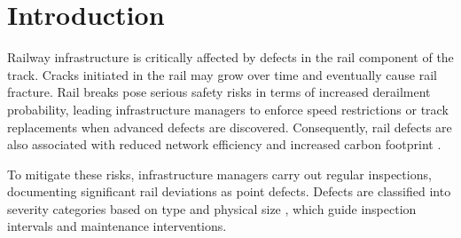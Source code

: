 

%

\section{Introduction} \label{sec:introduction} %
Railway infrastructure is critically affected by defects in the rail component of the track.
Cracks initiated in the rail may grow over time and eventually cause rail fracture. 
Rail breaks pose serious safety risks in terms of increased derailment probability, leading infrastructure managers to enforce speed restrictions or track replacements when advanced defects are discovered. 
Consequently, rail defects are also associated with reduced network efficiency and increased carbon footprint \citep{cannon2003a,Zoeteman2014DutchBeyond}.  

To mitigate these risks, infrastructure managers carry out regular inspections, documenting significant rail deviations as point defects. 
Defects are classified into severity categories based on type and physical size \citep{UIC_2002_defecthandbook}, which guide inspection intervals and maintenance interventions.  


